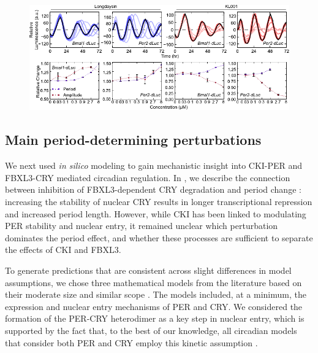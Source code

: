 \begin{figure}[h]
  \centering
  \includegraphics[width=\textwidth]{chap4/figures/fig1_ts.pdf}
  \label{fig:4-1b}
\end{figure}

\subsection{Main period-determining perturbations}

We next used {\it in silico} modeling to gain mechanistic insight into CKI-PER and FBXL3-CRY mediated circadian regulation. 
In , we describe the connection between inhibition of FBXL3-dependent CRY degradation and period change \cite{Hirota2012}: increasing the stability of nuclear CRY results in longer transcriptional repression and increased period length. 
However, while CKI has been linked to modulating PER stability and nuclear entry, it remained unclear which perturbation dominates the period effect, and whether these processes are sufficient to separate the effects of CKI and FBXL3.

To generate predictions that are consistent across slight differences in model assumptions, we chose three mathematical models from the literature based on their moderate size and similar scope \cite{Hirota2012, Leloup2003, Relogio2011}. 
The models included, at a minimum, the expression and nuclear entry mechanisms of PER and CRY. 
We considered the formation of the PER-CRY heterodimer as a key step in nuclear entry, which is supported by the fact that, to the best of our knowledge, all circadian models that consider both PER and CRY employ this kinetic assumption \cite{Hirota2012, Relogio2011, Leloup2003, Forger2003, Mirsky2009}.

